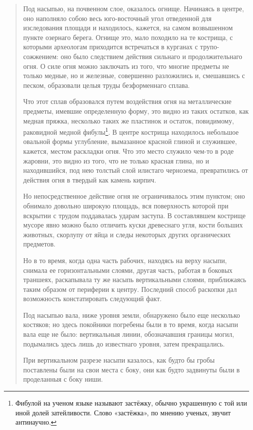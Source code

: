 \begin{quotation}
Под насыпью, на почвенном слое, оказалось огнище. Начинаясь в центре, оно наполняло собою весь юго-восточный угол отведенной для изследования площади и находилось, кажется, на самом возвышенном пункте озернаго берега. Огнище это, мало походило на те кострища, с которыми археологам приходится встречаться в курганах с трупо-сожжением: оно было следствием действия сильнаго и продолжительнаго огня. О силе огня можно заключать из того, что многие предметы не только медные, но и железные, совершенно разложились и, смешавшись с песком, образовали целыя труды безформеннаго сплава. 

Что этот сплав образовался путем воздействия огня на металлические предметы, имевшие определенную форму, это видно из таких остатков, как медная пряжка, несколько таких же пластинок и остаток, повидимому, раковидной медной фибулы\footnote{Фибулой на ученом языке называют застёжку, обычно украшенную с той или иной долей затейливости. Слово «застёжка», по мнению ученых, звучит антинаучно.}. В центре кострища находилось небольшое овальной формы углубление, вымазанное красной глиной и служившее, кажется, местом раскладки огня. Что это место служило чем-то в роде жаровни, это видно из того, что не только красная глина, но и находившийся, под нею толстый слой илистаго чернозема, превратились от действия огня в твердый как камень кирпич.

Но непосредственное действие огня не ограничивалось этим пунктом; оно обнимало довольно широкую площадь, вся поверхность которой при вскрытии с трудом поддавалась ударам заступа. В составлявшем кострище мусоре явно можно было отличить куски древеснаго угля, кости больших животных, скорлупу от яйца и следы некоторых других органических предметов.

Но в то время, когда одна часть рабочих, находясь на верху насыпи, снимала ее горизонтальными слоями, другая часть, работая в боковых траншеях, раскапывала ту же насыпь вертикальными слоями, приближаясь таким образом от периферии к центру. Последний способ раскопки дал возможность констатировать следующий факт.

Под насыпью вала, ниже уровня земли, обнаружено было еще несколько костяков; но здесь покойники погребены были в то время, когда насыпи вала еще не было: вертикальныя линии, обозначавшия границы могил, подымались здесь лишь до известнаго уровня, затем прекращались.

При вертикальном разрезе насыпи казалось, как будто бы гробы поставлены были на свои места с боку, они как будто задвинуты были в проделанныя с боку ниши.


\end{quotation}
